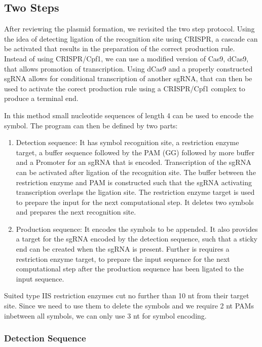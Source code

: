 \documentclass[
11pt, %
a4paper, %
oneside, %
headinclude,footinclude, %
BCOR5mm, %
]{scrartcl}
\begin{document}
\subsection{Two Steps}

After reviewing the plasmid formation, we revisited the two step protocol. Using
the idea of detecting ligation of the recognition site using CRISPR, a cascade
can be activated that results in the preparation of the correct production rule.
Instead of using CRISPR/Cpf1, we can use a modified version of Cas9, dCas9, that
allows promotion of transcription. Using dCas9 and a properly constructed sgRNA
allows for conditional transcription of another sgRNA, that can then be used to
activate the corect production rule using a CRISPR/Cpf1 complex to produce a
terminal end.

In this method small nucleotide sequences of length 4 can be used to encode the
symbol. The program can then be defined by two parts:
\begin{enumerate}
  \item Detection sequence: It has symbol recognition site, a restriction enzyme
    target, a buffer sequence followed by the PAM (GG) followed by more buffer
    and a Promoter for an sgRNA that is encoded. Transcription of the sgRNA can
    be activated after ligation of the recognition site. The buffer between the
    restriction enzyme and PAM is constructed such that the sgRNA activating
    transcription overlaps the ligation site. The restriction enzyme target is
    used to prepare the input for the next computational step. It deletes two
    symbols and prepares the next recognition site.
  \item Production sequence: It encodes the symbols to be appended. It also
    provides a target for the sgRNA encoded by the detection sequence, such that
    a sticky end can be created when the sgRNA is present. Further is requires a
    restriction enzyme target, to prepare the input sequence for the next
    computational step after the production sequence has been ligated to the
    input sequence.
\end{enumerate}
Suited type IIS restriction enzymes cut no further than 10 nt from their target
site. Since we need to use them to delete the symbols and we require 2 nt PAMs
inbetween all symbols, we can only use 3 nt for symbol encoding.

\subsubsection{Detection Sequence}
\end{document}
